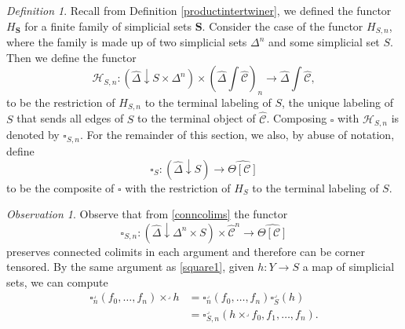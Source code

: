 \documentclass{amsart}
\numberwithin{equation}{section}
\theoremstyle{plain}   %
\theoremstyle{remark}
\newtheorem{obs}[subsection]{Observation}
\newtheorem{defn}[subsection]{Definition}
\theoremstyle{plain}
\newcommand{\overcat}[2]{{\left(#1\downarrow #2\right)}}
\newcommand{\psh}[1]{\ensuremath{\widehat{#1}}}
\newcommand{\C}{\ensuremath{\mathcal{C}}}
\newcommand{\cellset}{\ensuremath{\widehat{\Theta[\mathcal{C}]}}}
\newcommand{\ssetlab}{\ensuremath{\widehat{\Delta} \int \widehat{\mathcal{C}}}}
\begin{document}
\begin{defn}
	Recall from Definition \ref{productintertwiner}, we defined the functor \(H_\mathbf{S}\) for a finite family of simplicial sets \(\mathbf{S}\).  Consider the case of the functor \(H_{S,n}\), where the family is made up of two simplicial sets \(\Delta^n\) and some simplicial set \(S\).  Then we define the functor 
	\[\mathcal{H}_{S,n}: \overcat{\psh{\Delta}}{S\times \Delta^n} \times  \left(\ssetlab\right)_{n} \to \ssetlab,\]
	to be the restriction of \(H_{S,n}\) to the terminal labeling of \(S\), the unique labeling of \(S\) that sends all edges of \(S\) to the terminal object of \(\psh{\C}\).   Composing \(\square\) with \(\mathcal{H}_{S,n}\) is denoted by \(\square_{S,n}\).  For the remainder of this section, we also, by abuse of notation, define 
	\[\square_S:\overcat{\psh{\Delta}}{S} \to \cellset\]
	to be the composite of \(\square\) with the restriction of \(H_S\) to the terminal labeling of \(S\).  
\end{defn}

\begin{obs}\label{joyalsquare1}
	Observe that from \ref{conncolims} the functor 
	\[\square_{S,n}:\overcat{\psh{\Delta}}{\Delta^n\times S} \times\psh{\C}^n \to \cellset\]
	preserves connected colimits in each argument and therefore can be corner tensored. By the same argument as \ref{square1}, given \(h:Y\to S\) a map of simplicial sets, we can compute 
	\begin{align*}
		\square^\lrcorner_n(f_0,\dots,f_n) \times^\lrcorner h &= \square^\lrcorner_n(f_0,\dots,f_n) \square_S^\lrcorner(h)\\
		&= \square^\lrcorner_{S,n}(h\times^\lrcorner f_0,f_1,\dots,f_n).
	\end{align*}
\end{obs}
\end{document}
